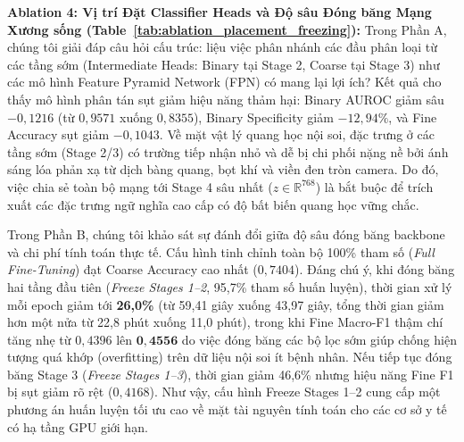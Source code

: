 \documentclass[runningheads]{llncs}
\begin{document}
\noindent \textbf{Ablation 4: Vị trí Đặt Classifier Heads và Độ sâu Đóng băng Mạng Xương sống (Table~\ref{tab:ablation_placement_freezing}):} 
Trong Phần A, chúng tôi giải đáp câu hỏi cấu trúc: liệu việc phân nhánh các đầu phân loại từ các tầng sớm (Intermediate Heads: Binary tại Stage 2, Coarse tại Stage 3) như các mô hình Feature Pyramid Network (FPN) có mang lại lợi ích? Kết quả cho thấy mô hình phân tán sụt giảm hiệu năng thảm hại: Binary AUROC giảm sâu $-0{,}1216$ (từ $0{,}9571$ xuống $0{,}8355$), Binary Specificity giảm $-12{,}94\%$, và Fine Accuracy sụt giảm $-0{,}1043$. Về mặt vật lý quang học nội soi, đặc trưng ở các tầng sớm (Stage 2/3) có trường tiếp nhận nhỏ và dễ bị chi phối nặng nề bởi ánh sáng lóa phản xạ từ dịch bàng quang, bọt khí và viền đen tròn camera. Do đó, việc chia sẻ toàn bộ mạng tới Stage 4 sâu nhất ($z \in \mathbb{R}^{768}$) là bắt buộc để trích xuất các đặc trưng ngữ nghĩa cao cấp có độ bất biến quang học vững chắc.

Trong Phần B, chúng tôi khảo sát sự đánh đổi giữa độ sâu đóng băng backbone và chi phí tính toán thực tế. Cấu hình tinh chỉnh toàn bộ 100\% tham số (\textit{Full Fine-Tuning}) đạt Coarse Accuracy cao nhất ($0{,}7404$). Đáng chú ý, khi đóng băng hai tầng đầu tiên (\textit{Freeze Stages 1--2}, 95,7\% tham số huấn luyện), thời gian xử lý mỗi epoch giảm tới \textbf{26,0\%} (từ 59,41 giây xuống 43,97 giây, tổng thời gian giảm hơn một nửa từ 22,8 phút xuống 11,0 phút), trong khi Fine Macro-F1 thậm chí tăng nhẹ từ $0{,}4396$ lên $\mathbf{0{,}4556}$ do việc đóng băng các bộ lọc sớm giúp chống hiện tượng quá khớp (overfitting) trên dữ liệu nội soi ít bệnh nhân. Nếu tiếp tục đóng băng Stage 3 (\textit{Freeze Stages 1--3}), thời gian giảm 46,6\% nhưng hiệu năng Fine F1 bị sụt giảm rõ rệt ($0{,}4168$). Như vậy, cấu hình Freeze Stages 1--2 cung cấp một phương án huấn luyện tối ưu cao về mặt tài nguyên tính toán cho các cơ sở y tế có hạ tầng GPU giới hạn.
\end{document}
